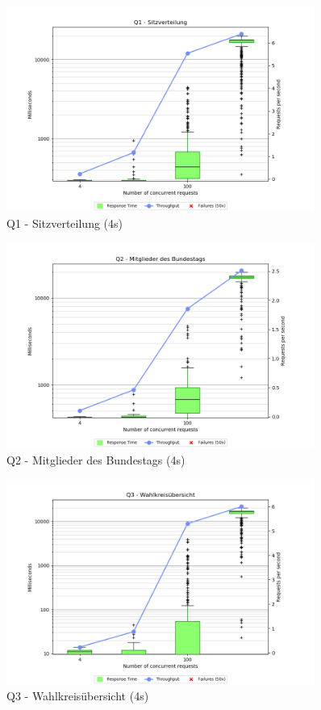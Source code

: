 \documentclass[a4paper]{scrreprt}
\begin{document}
\begin{figure}[htb!]
	\centering
	\includegraphics[width=0.9\textwidth]{images/plots_4s/Q1}
	\caption {Q1 - Sitzverteilung (4s)}
\end{figure}

\begin{figure}[htb!]
	\centering
	\includegraphics[width=0.9\textwidth]{images/plots_4s/Q2}
	\caption {Q2 - Mitglieder des Bundestags (4s)}
\end{figure}

\begin{figure}[htb!]
	\centering
	\includegraphics[width=0.9\textwidth]{images/plots_4s/Q3}
	\caption {Q3 - Wahlkreisübersicht (4s)}
\end{figure}
\end{document}
